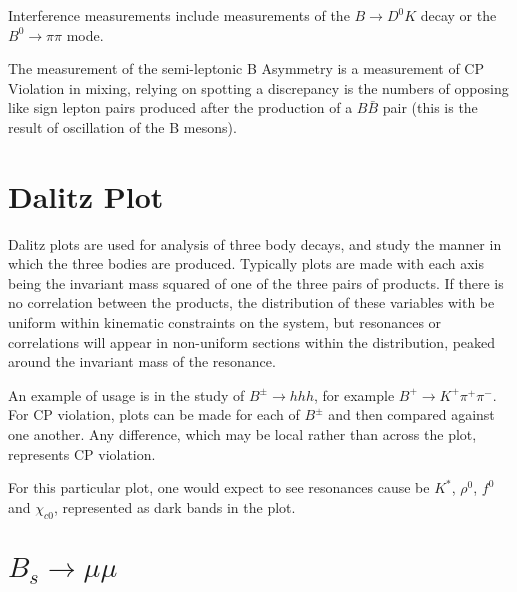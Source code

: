 \documentclass[]{article}
\begin{document}
	Interference measurements include measurements of the $B \rightarrow D^0 K$ decay or the $B^0 \rightarrow \pi\pi$ mode.
	
	The measurement of the semi-leptonic B Asymmetry is a measurement of CP Violation in mixing, relying on spotting a discrepancy is the numbers of opposing like sign lepton pairs  produced  after the production of a $B\bar{B}$ pair (this is the result of oscillation of the B mesons).
	
\section{}

\section{}

\section{}


\newpage
\section{Dalitz Plot}

	Dalitz plots are used for analysis of three body decays, and study the manner in which the three bodies are produced. Typically plots are made with each axis being the invariant mass squared of one of the three pairs of products. If there is no correlation between the products, the distribution of these variables with be uniform within kinematic constraints on the system, but resonances or correlations will appear in non-uniform sections within the distribution, peaked around the invariant mass of the resonance.
	
	An example of usage is in the study of $B^\pm \rightarrow hhh$, for example $B^+\rightarrow K^+\pi^+\pi^-$. For CP violation, plots can be made for each of $B^\pm$ and then compared against one another. Any difference, which may be local rather than across the plot, represents CP violation.
	
	For this particular plot, one would expect to see resonances cause be $K^*$, $\rho^0$, $f^0$ and $\chi_{c0}$, represented as dark bands in the plot.
	
\section{$B_s\rightarrow\mu\mu$}
\end{document}
